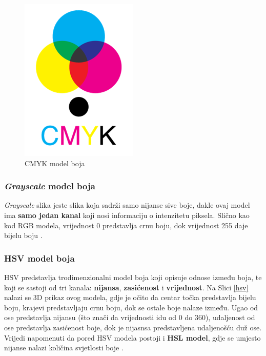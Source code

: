 \documentclass[12pt,a4paper]{article}
\begin{document}
\begin{figure}[H]

\center
\includegraphics[scale=0.75]{../res/cmyk.PNG}
\caption{CMYK model boja \cite{bels4}}
\label{cmyk}

\end{figure}

\subsubsection{\textit{Grayscale} model boja}

\textit{Grayscale} slika jeste slika koja sadrži samo nijanse sive boje, dakle ovaj model ima \textbf{samo jedan kanal} koji nosi informaciju o intenzitetu piksela. Slično kao kod RGB modela, vrijednost 0 predstavlja crnu boju, dok vrijednost 255 daje bijelu boju \cite{bels2}.

\subsubsection{HSV model boja}

HSV predstavlja trodimenzionalni model boja koji opisuje odnose između boja, te koji se sastoji od tri kanala: \textbf{nijansa}, \textbf{zasićenost} i \textbf{vrijednost}. Na Slici \ref{hsv} nalazi se 3D prikaz ovog modela, gdje je očito da centar točka predstavlja bijelu boju, krajevi predstavljaju crnu boju, dok se ostale boje nalaze između. Ugao od ose predstavlja nijansu (što znači da vrijednosti idu od 0 do 360), udaljenost od ose predstavlja zasićenost boje, dok je nijasnsa predstavljena udaljenošću duž ose. Vrijedi napomenuti da pored HSV modela postoji i \textbf{HSL model}, gdje se umjesto nijanse nalazi količina svjetlosti boje \cite{bels2}.
\end{document}

